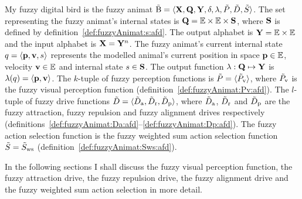 \begin{defn}
\label{def:fuzzyAnimat:afd}
\hspace*{-.8pt}My fuzzy digital bird is the fuzzy animat ${\tilde{\mathrm{B}}}=\langle{\ensuremath{\mathbf{X}}},{\mathbf{Q}},{\mathbf{Y}},\delta,\lambda,{\tilde{P}},{\tilde{D}},{\tilde{S}}\rangle$. The set representing the fuzzy animat's internal states is ${\mathbf{Q}}=\mathbb{E} \times \mathbb{E} \times {\ensuremath{\mathbf{S}}}$, where ${\mathbf{S}}$ is defined by definition~\ref{def:fuzzyAnimat:s:afd}. The output alphabet is ${\mathbf{Y}}=\mathbb{E} \times \mathbb{E}$ and the input alphabet is ${\mathbf{X}}={\mathbf{Y}}^n$. The fuzzy animat's current internal state $q=\langle{\ensuremath{\mathbf{p}}},{\mathbf{v}},s\rangle$ represents the modelled animal's current position in space ${\mathbf{p}} \in \mathbb{E}$, velocity ${\mathbf{v}} \in \mathbb{E}$ and internal state $s \in {\ensuremath{\mathbf{S}}}$. The output function $\lambda: {\mathbf{Q}} \mapsto {\ensuremath{\mathbf{Y}}}$ is $\lambda(q)=\langle{\ensuremath{\mathbf{p}}},{\mathbf{v}}\rangle$. The $k$-tuple of fuzzy perception functions is ${\tilde{P}}=\langle{\ensuremath{\tilde{P}}}_\mathrm{v}\rangle$, where ${\tilde{P}}_\mathrm{v}$ is the fuzzy visual perception function (definition~\ref{def:fuzzyAnimat:Pv:afd}). The $l$-tuple of fuzzy drive functions ${\tilde{D}}=\langle{\ensuremath{\tilde{D}}}_\mathrm{a},{\tilde{D}}_\mathrm{r},{\tilde{D}}_\mathrm{p}\rangle$, where ${\tilde{D}}_\mathrm{a}$, ${\tilde{D}}_\mathrm{r}$ and ${\tilde{D}}_\mathrm{p}$ are the fuzzy attraction, fuzzy repulsion and fuzzy alignment drives respectively  (definitions~\ref{def:fuzzyAnimat:Da:afd}--\ref{def:fuzzyAnimat:Dp:afd}). The fuzzy action selection function is the fuzzy weighted sum action selection function ${\tilde{S}}={\tilde{S}}_\mathrm{ws}$ (definition~\ref{def:fuzzyAnimat:Sws:afd}).
\end{defn}

In the following sections I shall discuss the fuzzy visual perception function, the fuzzy attraction drive, the fuzzy repulsion drive, the fuzzy alignment drive and the fuzzy weigh\-t\-ed sum action selection in more detail.

